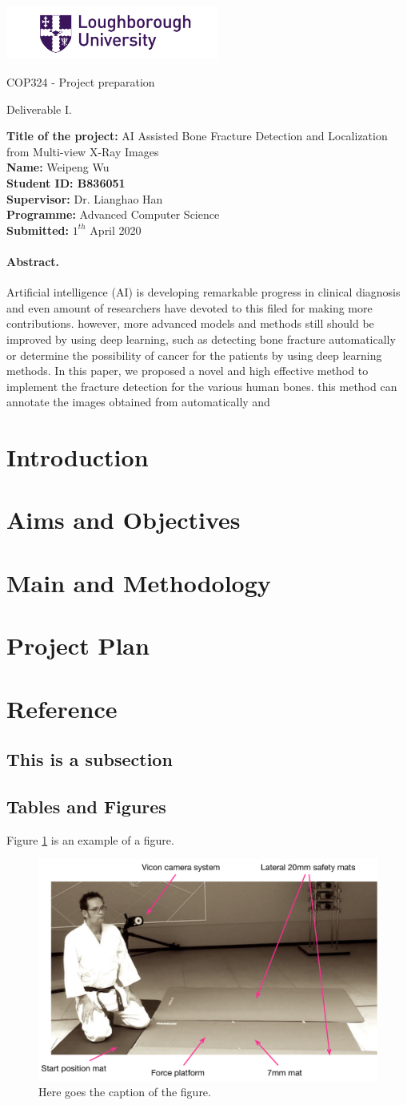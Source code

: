 \documentclass[12pt,oneside,a4paper]{article}
\newcommand*{\makeTitleParagraph}{
\begingroup
\begin{center}
\includegraphics[width = 7cm]{LoughboroughLogo.png} \par
COP324 - Project preparation\par
Deliverable I. \par
\end{center}

 
\noindent


\noindent
\textbf{Title of the project:} AI Assisted Bone Fracture Detection and Localization from Multi-view X-Ray Images\\ 
\textbf{Name:} Weipeng Wu\\
\textbf{Student ID: B836051}\\
\textbf{Supervisor:} Dr. Lianghao Han\\
\textbf{Programme:} Advanced Computer Science\\
\textbf{Submitted:} $1^{th}$ April 2020\\
\endgroup}
\begin{document}
\makeTitleParagraph %

\paragraph{Abstract.} Artificial intelligence (AI) is developing remarkable progress in clinical diagnosis and even amount of researchers have devoted to this filed for making more contributions. however, more advanced models and methods still should be improved by using deep learning, such as detecting bone fracture automatically or determine the possibility of cancer for the patients by using deep learning methods. In this paper, we proposed a novel and high effective method to implement the fracture detection for the various human bones. this method can annotate the images obtained from  automatically and 

\section{Introduction}


\section{Aims and Objectives}
\section{Main and Methodology}
\section{Project Plan}
\section{Reference}
\subsection{This is a subsection}

\subsection{Tables and Figures}

Figure \ref{fig.niceFigure} is an example of a figure.
\begin{figure}
\begin{center}
\includegraphics[width=0.6\columnwidth]{f2_expSetup}
\caption{Here goes the caption of the figure.}
\label{fig.niceFigure}
\end{center}
\end{figure}
\end{document}
